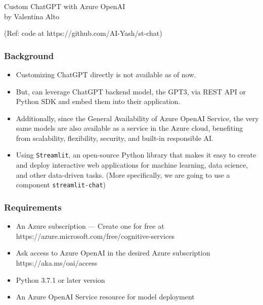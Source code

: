 




\begin{frame}[fragile]\frametitle{}
\begin{center}
{\Large Custom ChatGPT with Azure OpenAI \\ by Valentina Alto}

{\tiny (Ref: code at https://github.com/AI-Yash/st-chat)}

\end{center}
\end{frame}

\begin{frame}[fragile]\frametitle{ Background}


\begin{itemize}
\item Customizing ChatGPT directly is not available as of now.
\item But, can leverage ChatGPT backend model, the GPT3, via REST API or Python SDK and embed them into their application.
\item Additionally, since the General Availability of Azure OpenAI Service, the very same models are also available as a service in the Azure cloud, benefiting from scalability, flexibility, security, and built-in responsible AI.
\item Using  \lstinline|Streamlit|, an open-source Python library that makes it easy to create and deploy interactive web applications for machine learning, data science, and other data-driven tasks. (More specifically, we are going to use a component \lstinline|streamlit-chat|)
\end{itemize}	 

\end{frame}

\begin{frame}[fragile]\frametitle{ Requirements}

\begin{itemize}
\item An Azure subscription — Create one for free at https://azure.microsoft.com/free/cognitive-services
\item Ask access to Azure OpenAI in the desired Azure subscription https://aka.ms/oai/access
\item Python 3.7.1 or later version
\item An Azure OpenAI Service resource for model deployment
\end{itemize}	 

\end{frame}


